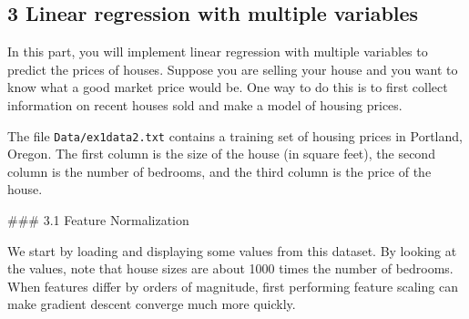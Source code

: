 \documentclass[11pt]{article}
\begin{document}
\subsection{3 Linear regression with multiple
variables}\label{linear-regression-with-multiple-variables}

In this part, you will implement linear regression with multiple
variables to predict the prices of houses. Suppose you are selling your
house and you want to know what a good market price would be. One way to
do this is to first collect information on recent houses sold and make a
model of housing prices.

The file \texttt{Data/ex1data2.txt} contains a training set of housing
prices in Portland, Oregon. The first column is the size of the house
(in square feet), the second column is the number of bedrooms, and the
third column is the price of the house.

 \#\#\# 3.1 Feature Normalization

We start by loading and displaying some values from this dataset. By
looking at the values, note that house sizes are about 1000 times the
number of bedrooms. When features differ by orders of magnitude, first
performing feature scaling can make gradient descent converge much more
quickly.
\end{document}
